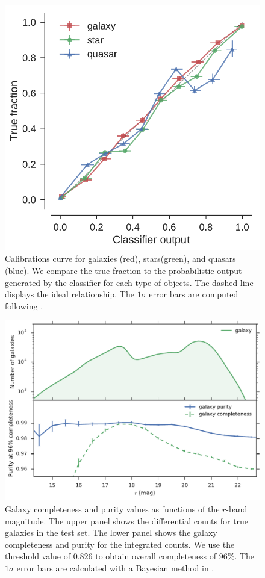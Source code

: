 \documentclass[fleqn,usenatbib]{mnras}
\begin{document}
\begin{figure}
  \centering
  \includegraphics[width=\columnwidth]{figures/calibration_curve.pdf}
  \caption{
    Calibrations curve for galaxies (red), stars(green), and quasars (blue).
    We compare the true fraction to the probabilistic output generated by the classifier for each type
    of objects.
    The dashed line displays the ideal relationship.
    The $1 \sigma$ error bars are computed following \citet{paterno2004calculating}.}
  \label{fig:calibration_curve}
\end{figure}


\begin{figure}
  \centering
  \includegraphics[width=\columnwidth]{figures/gal_comp_pur.pdf}
  \caption{
    Galaxy completeness and purity values as functions of the $r$-band magnitude.
    The upper panel shows the differential counts for true galaxies in the test set.
    The lower panel shows the galaxy completeness and purity for the integrated counts.
    We use the threshold value of 0.826 to obtain overall completeness of $96\%$.
    The $1 \sigma$ error bars are calculated with a Bayesian method in
    \citet{paterno2004calculating}.}
  \label{fig:gal_comp_pur}
\end{figure}
\end{document}
